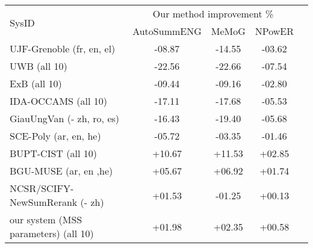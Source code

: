 
\begin{tabular*}{\textwidth}{@{\extracolsep{\fill}}lcccc} 
\hline \hline
\multirow{2}{*}{SysID} & \multicolumn{3}{c}{Our method improvement \%}\\
\cline{2-4}
					& AutoSummENG 	& MeMoG 	& NPowER \\
\hline
UJF-Grenoble (fr, en, el) 	& -08.87 		& -14.55	& -03.62 \\
UWB (all 10) 		& -22.56 		& -22.66 	& -07.54 \\
ExB (all 10) 		& -09.44 		& -09.16 	& -02.80 \\
IDA-OCCAMS (all 10) 		& -17.11 		& -17.68 	& -05.53 \\
GiauUngVan (- zh, ro, es)	& -16.43		& -19.40	& -05.68 \\
SCE-Poly (ar, en, he)	& -05.72		& -03.35	& -01.46 \\
BUPT-CIST (all 10)		& +10.67		& +11.53	& +02.85 \\
BGU-MUSE (ar, en ,he)	& +05.67		& +06.92	& +01.74 \\
NCSR/SCIFY-NewSumRerank (- zh)		& +01.53		& -01.25	& +00.13 \\
\hline
our system (MSS parameters) (all 10)		& +01.98		& +02.35	& +00.58 \\
\hline \hline
\end{tabular*}
